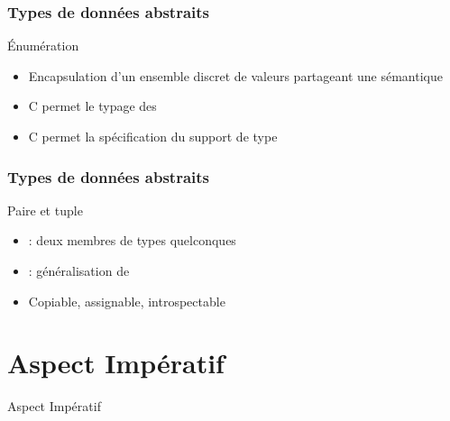 \documentclass[svgnames]{beamer}
\def\C++{\textup{C}\nolinebreak[4]\hspace{-.05em}\raisebox{.4ex}{\relsize{-3}{\textbf{++}}}}
\begin{document}
\begin{frame}
  \frametitle{Types de données abstraits}
  \begin{block}{Énumération}
  \begin{itemize}
  \footnotesize
  \item Encapsulation d'un ensemble discret de valeurs partageant une sémantique
  \item \C++ permet le typage des 
  \item \C++ permet la spécification du support de type
  \end{itemize}

  \begin{overlayarea}{\textwidth}{4cm}
  \end{overlayarea}
  \end{block}
\end{frame}

\begin{frame}
  \frametitle{Types de données abstraits}
  \begin{block}{Paire et tuple}
  \begin{itemize}
  \item {} : deux membres de types quelconques
  \item {} : généralisation de 
  \item Copiable, assignable, introspectable
  \end{itemize}

  \begin{overlayarea}{\textwidth}{5cm}
  \end{overlayarea}
  \end{block}
\end{frame}

\section{Aspect Impératif}
\begin{frame}[plain]
\begin{center}\Huge Aspect Impératif\end{center}
\end{frame}
\end{document}

